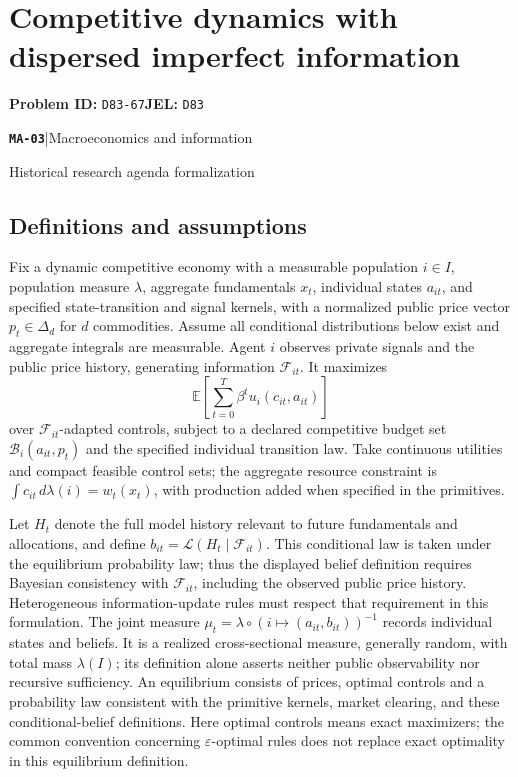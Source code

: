 \documentclass[11pt,a4paper]{article}
\newcommand{\E}{\mathbb E}
\newcommand{\entrymeta}[3]{{\sffamily\small\color{muted}\textbf{\texttt{#1}}\quad|\quad #2\par #3\par}}
\begin{document}
\section*{Competitive dynamics with dispersed imperfect information}
\textbf{Problem ID:} \texttt{D83-67}\quad \textbf{JEL:} \texttt{D83}\par
\label{problem:OP-0584}
\label{beyond:MA-03}
\entrymeta{MA-03}{Macroeconomics and information}{Historical research agenda formalization}
\subsection*{Definitions and assumptions}
Fix a dynamic competitive economy with a measurable population $i\in I$, population measure $\lambda$, aggregate fundamentals $x_t$, individual states $a_{it}$, and specified state-transition and signal kernels, with a normalized public price vector $p_t\in\Delta_d$ for $d$ commodities. Assume all conditional distributions below exist and aggregate integrals are measurable. Agent $i$ observes private signals and the public price history, generating information $\mathcal F_{it}$. It maximizes
\[
 \E\left[\sum_{t=0}^{T}\beta^tu_i(c_{it},a_{it})\right]
\]
over $\mathcal F_{it}$-adapted controls, subject to a declared competitive budget set $\mathcal B_i(a_{it},p_t)$ and the specified individual transition law. Take continuous utilities and compact feasible control sets; the aggregate resource constraint is $\int c_{it}\,d\lambda(i)=w_t(x_t)$, with production added when specified in the primitives.

Let $H_t$ denote the full model history relevant to future fundamentals and allocations, and define $b_{it}=\mathcal L(H_t\mid\mathcal F_{it})$. This conditional law is taken under the equilibrium probability law; thus the displayed belief definition requires Bayesian consistency with $\mathcal F_{it}$, including the observed public price history. Heterogeneous information-update rules must respect that requirement in this formulation. The joint measure $\mu_t=\lambda\circ(i\mapsto(a_{it},b_{it}))^{-1}$ records individual states and beliefs. It is a realized cross-sectional measure, generally random, with total mass $\lambda(I)$; its definition alone asserts neither public observability nor recursive sufficiency. An equilibrium consists of prices, optimal controls and a probability law consistent with the primitive kernels, market clearing, and these conditional-belief definitions. Here optimal controls means exact maximizers; the common convention concerning $\varepsilon$-optimal rules does not replace exact optimality in this equilibrium definition.
\end{document}
